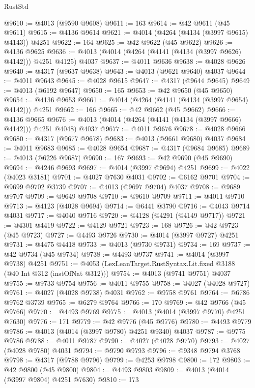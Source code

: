 \begin{lexlean}{RustStd}
\begin{coremodule}
@9610 := @4013 (@9590 @9608)
@9611 := 163
@9614 := @42 @9611 (@45 @9611)
@9615 := @4136 @9614
@9621 := @4014 (@4264 (@4134 (@3997 @9615) @4143)) @4251
@9622 := 164
@9625 := @42 @9622 (@45 @9622)
@9626 := @4136 @9625
@9636 := @4013 (@4014 (@4264 (@4141 (@4134 (@3997 @9626) @4142))) @4251 @4125) @4037
@9637 := @4011 @9636
@9638 := @4028 @9626
@9640 := @4317 (@9637 @9638)
@9643 := @4013 (@9621 @9640) @4037
@9644 := @4011 @9643
@9645 := @4028 @9615
@9647 := @4317 (@9644 @9645)
@9649 := @4013 (@6192 @9647)
@9650 := 165
@9653 := @42 @9650 (@45 @9650)
@9654 := @4136 @9653
@9661 := @4014 (@4264 (@4141 (@4134 (@3997 @9654) @4142))) @4251
@9662 := 166
@9665 := @42 @9662 (@45 @9662)
@9666 := @4136 @9665
@9676 := @4013 (@4014 (@4264 (@4141 (@4134 (@3997 @9666) @4142))) @4251 @4048) @4037
@9677 := @4011 @9676
@9678 := @4028 @9666
@9680 := @4317 (@9677 @9678)
@9683 := @4013 (@9661 @9680) @4037
@9684 := @4011 @9683
@9685 := @4028 @9654
@9687 := @4317 (@9684 @9685)
@9689 := @4013 (@6226 @9687)
@9690 := 167
@9693 := @42 @9690 (@45 @9690)
@9694 := @4246 @9693
@9697 := @4014 (@3997 @9694) @4251
@9699 := @4022 (@4023 @3181)
@9701 := @4027 @7630 @4031
@9702 := @6162 @9701
@9704 := @9699 @9702 @3739
@9707 := @4013 (@9697 @9704) @4037
@9708 := @9689 @9707
@9709 := @9649 @9708
@9710 := @9610 @9709
@9711 := @4011 @9710
@9713 := @4123 (@4028 @9694)
@9714 := @6441 @3790
@9716 := @4043 @9714 @4031
@9717 := @4040 @9716
@9720 := @4128 (@4291 (@4149 @9717))
@9721 := @4301 @4419
@9722 := @4129 @9721
@9723 := 168
@9726 := @42 @9723 (@45 @9723)
@9727 := @4493 @9726
@9730 := @4014 (@3997 @9727) @4251
@9731 := @4475 @4418
@9733 := @4013 (@9730 @9731)
@9734 := 169
@9737 := @42 @9734 (@45 @9734)
@9738 := @4493 @9737
@9741 := @4014 (@3997 @9738) @4251
@9751 := @4053 (LexLeanTarget.RustSyntax.Lit.fixed @3188 (@40 Int @312 (instOfNat @312)))
@9754 := @4013 (@9741 @9751) @4037
@9755 := @9733 @9754
@9756 := @4011 @9755
@9758 := @4027 (@4028 @9727)
@9761 := @4027 (@4028 @9738) @4031
@9762 := @9758 @9761
@9764 := @6786 @9762 @3739
@9765 := @6279 @9764
@9766 := 170
@9769 := @42 @9766 (@45 @9766)
@9770 := @4493 @9769
@9775 := @4013 (@4014 (@3997 @9770) @4251 @7630)
@9776 := 171
@9779 := @42 @9776 (@45 @9776)
@9780 := @4493 @9779
@9786 := @4013 (@4014 (@3997 @9780) @4251 @9340) @4037
@9787 := @9775 @9786
@9788 := @4011 @9787
@9790 := @4027 (@4028 @9770)
@9793 := @4027 (@4028 @9780) @4031
@9794 := @9790 @9793
@9796 := @9348 @9794 @3768
@9798 := @4317 (@9788 @9796)
@9799 := @4253 @9798
@9800 := 172
@9803 := @42 @9800 (@45 @9800)
@9804 := @4493 @9803
@9809 := @4013 (@4014 (@3997 @9804) @4251 @7630)
@9810 := 173

\end{coremodule}
\end{lexlean}
